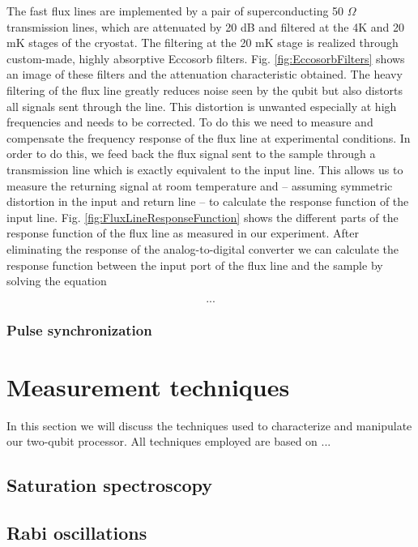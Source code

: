 The fast flux lines are implemented by a pair of superconducting 50 $\Omega$ transmission lines, which are attenuated by 20 dB and filtered at the 4K and 20 mK stages of the cryostat. The filtering at the 20 mK stage is realized through custom-made, highly absorptive Eccosorb filters. Fig. \ref{fig:EccosorbFilters} shows an image of these filters and the attenuation characteristic obtained. The heavy filtering of the flux line greatly reduces noise seen by the qubit but also distorts all signals sent through the line. This distortion is unwanted especially at high frequencies and needs to be corrected. To do this we need to measure and compensate the frequency response of the flux line at experimental conditions. In order to do this, we feed back the flux signal sent to the sample through a transmission line which is exactly equivalent to the input line. This allows us to measure the returning signal at room temperature and -- assuming symmetric distortion in the input and return line -- to calculate the response function of the input line. Fig. \ref{fig:FluxLineResponseFunction} shows the different parts of the response function of the flux line as measured in our experiment. After eliminating the response of the analog-to-digital converter we can calculate the response function between the input port of the flux line and the sample by solving the equation

\begin{equation}
...
\end{equation}

\subsection{Pulse synchronization}

\chapter{Measurement techniques}

In this section we will discuss the techniques used to characterize and manipulate our two-qubit processor. All techniques employed are based on ...

\section{Saturation spectroscopy}

\section{Rabi oscillations}

